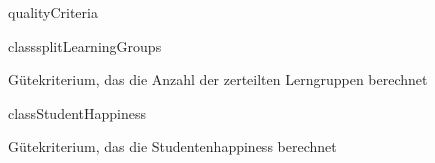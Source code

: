 \begin{texdocpackage}{qualityCriteria}
\begin{texdocclass}{class}{splitLearningGroups}
\label{texdoclet:qualityCriteria.splitLearningGroups}
\begin{texdocclassintro}
Gütekriterium, das die Anzahl der zerteilten Lerngruppen berechnet\end{texdocclassintro}
\begin{texdocclassconstructors}
\end{texdocclassconstructors}
\begin{texdocclassmethods}
\end{texdocclassmethods}
\end{texdocclass}


\begin{texdocclass}{class}{StudentHappiness}
\label{texdoclet:qualityCriteria.StudentHappiness}
\begin{texdocclassintro}
Gütekriterium, das die Studentenhappiness berechnet\end{texdocclassintro}
\begin{texdocclassconstructors}
\end{texdocclassconstructors}
\begin{texdocclassmethods}
\end{texdocclassmethods}
\end{texdocclass}


\end{texdocpackage}



